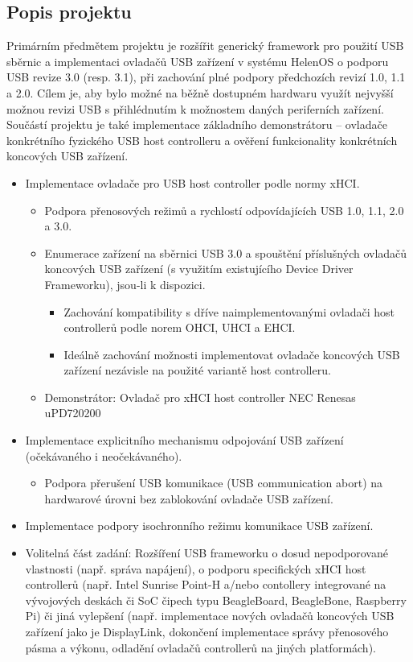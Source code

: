 \subsection{Popis projektu}

Primárním předmětem projektu je rozšířit generický framework pro použití USB sběrnic a
implementaci ovladačů USB zařízení v systému HelenOS o podporu USB revize 3.0 (resp. 3.1), při
zachování plné podpory předchozích revizí 1.0, 1.1 a 2.0. Cílem je, aby bylo možné na běžně
dostupném hardwaru využít nejvyšší možnou revizi USB s přihlédnutím k možnostem daných
periferních zařízení. Součástí projektu je také implementace základního demonstrátoru – ovladače
konkrétního fyzického USB host controlleru a ověření funkcionality konkrétních koncových USB
zařízení.

\begin{itemize}
	\item
		Implementace ovladače pro USB host controller podle normy xHCI.
		\begin{itemize}
			\item Podpora přenosových režimů a rychlostí odpovídajících USB 1.0, 1.1, 2.0 a 3.0.
			\item
				Enumerace zařízení na sběrnici USB 3.0 a spouštění příslušných ovladačů koncových USB zařízení (s využitím existujícího Device Driver Frameworku), jsou-li k dispozici.
				\begin{itemize}
					\item Zachování kompatibility s dříve naimplementovanými ovladači host controllerů podle norem OHCI, UHCI a EHCI.
					\item Ideálně zachování možnosti implementovat ovladače koncových USB zařízení nezávisle na použité variantě host controlleru.
				\end{itemize}
			\item Demonstrátor: Ovladač pro xHCI host controller NEC Renesas uPD720200
		\end{itemize}

	\item
		Implementace explicitního mechanismu odpojování USB zařízení (očekávaného i neočekávaného).
		\begin{itemize}
			\item Podpora přerušení USB komunikace (USB communication abort) na hardwarové úrovni bez zablokování ovladače USB zařízení.
		\end{itemize}

	\item Implementace podpory isochronního režimu komunikace USB zařízení.
	\item Volitelná část zadání: Rozšíření USB frameworku o dosud nepodporované vlastnosti (např. správa napájení), o podporu specifických xHCI host controllerů (např. Intel Sunrise Point-H a/nebo contollery integrované na vývojových deskách či SoC čipech typu BeagleBoard, BeagleBone, Raspberry Pi) či jiná vylepšení (např. implementace nových ovladačů koncových USB zařízení jako je DisplayLink, dokončení implementace správy přenosového pásma a výkonu, odladění ovladačů controllerů na jiných platformách).

\end{itemize}

